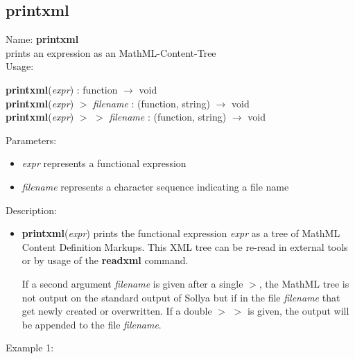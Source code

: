 \subsection{printxml}
\label{labprintxml}
\noindent Name: \textbf{printxml}\\
prints an expression as an MathML-Content-Tree\\

\noindent Usage: 
\begin{center}
\textbf{printxml}(\emph{expr}) : \textsf{function} $\rightarrow$ \textsf{void}\\
\textbf{printxml}(\emph{expr}) $>$ \emph{filename} : (\textsf{function}, \textsf{string}) $\rightarrow$ \textsf{void}\\
\textbf{printxml}(\emph{expr}) $>$ $>$ \emph{filename} : (\textsf{function}, \textsf{string}) $\rightarrow$ \textsf{void}\\
\end{center}
Parameters: 
\begin{itemize}
\item \emph{expr} represents a functional expression
\item \emph{filename} represents a character sequence indicating a file name
\end{itemize}
\noindent Description: \begin{itemize}

\item \textbf{printxml}(\emph{expr}) prints the functional expression \emph{expr} as a tree of
   MathML Content Definition Markups. This XML tree can be re-read in
   external tools or by usage of the \textbf{readxml} command.
    
   If a second argument \emph{filename} is given after a single $>$, the
   MathML tree is not output on the standard output of Sollya but if in
   the file \emph{filename} that get newly created or overwritten. If a double
   $>$ $>$ is given, the output will be appended to the file \emph{filename}.
\end{itemize}
\noindent Example 1: 
